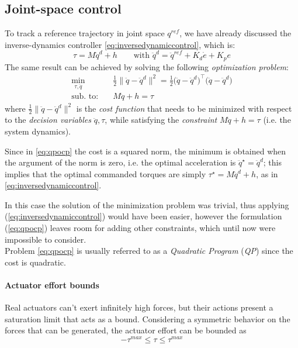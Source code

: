 \subsection{Joint-space control}
	To track a reference trajectory in joint space $q^{ref}$, we have already discussed the inverse-dynamics controller \eqref{eq:inversedynamiccontrol}, which is:
	\[ \tau = M \ddot q^d + h \qquad\textrm{with } \ddot q^d = \ddot q^{ref} + K_d \dot e + K_p e \]
	The same result can be achieved by solving the following \textit{optimization problem}:
	\begin{equation} \label{eq:qpocp}
	\begin{split}
		\min_{\tau, \ddot q}\quad & \frac 1 2 \big\|\ddot q - \ddot q^d \big\|^2 = \frac 1 2 \big(\ddot q - \ddot q^d\big)^\top \big(\ddot q - \ddot q^d\big) \\
		\textrm{sub. to:}\quad & M \ddot q + h = \tau
	\end{split}
	\end{equation}
	where $\frac 1 2 \big\|\ddot q - \ddot q^d \big\|^2$ is the \textit{cost function} that needs to be minimized with respect to the \textit{decision variables} $\ddot q, \tau$, while satisfying the \textit{constraint} $M\ddot q + h = \tau$ (i.e. the system dynamics).
	
	Since in \eqref{eq:qpocp} the cost is a squared norm, the minimum is obtained when the argument of the norm is zero, i.e. the optimal acceleration is $\ddot q^\star = \ddot q^d$; this implies that the optimal commanded torques are simply $\tau^\star = M \ddot q^d + h$, as in \eqref{eq:inversedynamiccontrol}.
	
	In this case the solution of the minimization problem was trivial, thus applying (\ref{eq:inversedynamiccontrol}) would have been easier, however the formulation (\ref{eq:qpocp}) leaves room for adding other constraints, which until now were impossible to consider. \\
	Problem \eqref{eq:qpocp} is usually referred to as a \textit{Quadratic Program} (\textit{QP}) since the cost is quadratic.
	
	\paragraph{Actuator effort bounds} Real actuators can't exert infinitely high forces, but their actions present a saturation limit that acts as a bound. Considering a symmetric behavior on the forces that can be generated, the actuator effort can be bounded as
	\[ -\tau^{max} \leq \tau \leq \tau^{max} \]
	

